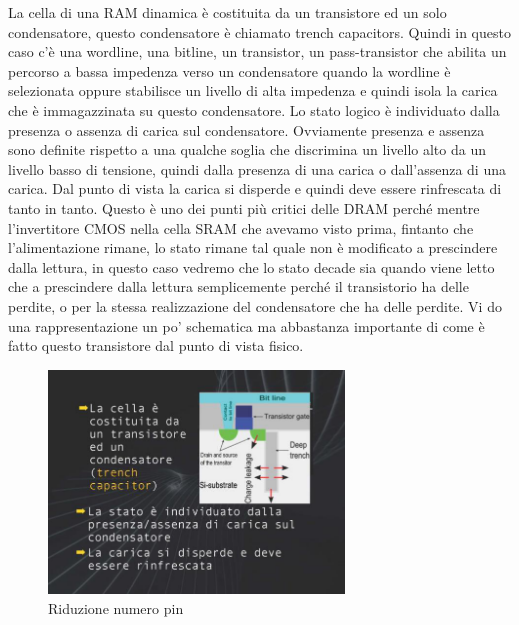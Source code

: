 La cella di una RAM dinamica è costituita da un transistore ed un solo condensatore, questo condensatore è chiamato trench capacitors.
Quindi in questo caso c'è una wordline, una bitline, un transistor, un pass-transistor che abilita un percorso a bassa impedenza verso un condensatore quando la wordline è selezionata oppure stabilisce un livello di alta impedenza e quindi isola la carica che è immagazzinata su questo condensatore.
Lo stato logico è individuato dalla presenza o assenza di carica sul condensatore.
Ovviamente presenza e assenza sono definite rispetto a una qualche soglia che discrimina un livello alto da un livello basso di tensione, quindi dalla presenza di una carica o dall'assenza di una carica.
Dal punto di vista la carica si disperde e quindi deve essere rinfrescata di tanto in tanto.
Questo è uno dei punti più critici delle DRAM perché mentre l'invertitore CMOS nella cella SRAM che avevamo visto prima, fintanto che l'alimentazione rimane, lo stato rimane tal quale non è modificato a prescindere dalla lettura, in questo caso vedremo che lo stato decade sia quando viene letto che a prescindere dalla lettura semplicemente perché il transistorio ha delle perdite, o  per la stessa realizzazione del condensatore che ha delle perdite.
Vi do una rappresentazione un po' schematica ma abbastanza importante di come è fatto questo transistore dal punto di vista fisico.

\FloatBarrier
\begin{figure}[H]
  \centering
  \includegraphics[width=0.70\textwidth,
                    trim=40 40 40 40, %
                    clip]
                    {images/Lez04_p04_fig_01.png}
  \caption{Riduzione numero pin}
  \label{fig:Lez04_p04_fig_ì1}
\end{figure}
\FloatBarrier
\noindent

